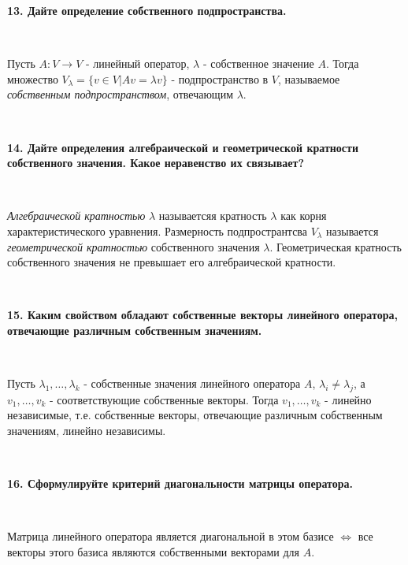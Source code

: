 \documentclass{article}
\begin{document}
    \textbf{13. Дайте определение собственного подпространства.}

    $\;$
        {
        \setlength{\parindent}{0.4cm}
        \hangindent=0.4cm

        Пусть $A:V\rightarrow V$ - линейный оператор, $\lambda$ - собственное значение $A$. Тогда множество $V_\lambda = \{v\in V| Av=\lambda v\}$ - подпространство в $V$, называемое \textit{собственным подпространством}, отвечающим $\lambda$.

        $\;$
        \setlength{\parindent}{0cm}
        \hangindent=0cm
    }

    \newpage

    \textbf{14. Дайте определения алгебраической и геометрической кратности собственного значения. Какое неравенство их связывает?}

    $\;$
        {
        \setlength{\parindent}{0.4cm}
        \hangindent=0.4cm

        \textit{Алгебраической кратностью} $\lambda$ называетсяя кратность $\lambda$ как корня характеристического уравнения. Размерность подпространтсва $V_\lambda$ называется \textit{геометрической кратностью}
        собственного значения $\lambda$. Геометрическая кратность собственного значения не превышает его алгебраической кратности.

        $\;$
        \setlength{\parindent}{0cm}
        \hangindent=0cm
    }


    \textbf{15. Каким свойством обладают собственные векторы линейного оператора, отвечающие различным собственным значениям.}

    $\;$
        {
        \setlength{\parindent}{0.4cm}
        \hangindent=0.4cm

        Пусть $\lambda_1,\dots,\lambda_k$ - собственные значения линейного оператора $A$, $\lambda_i \not = \lambda_j$, а $v_1, \dots, v_k$ - соответствующие собственные векторы. Тогда $v_1, \dots, v_k$ - линейно независимые, т.е. собственные векторы, отвечающие различным собственным значениям, линейно независимы.

        $\;$
        \setlength{\parindent}{0cm}
        \hangindent=0cm
    }

    \textbf{16. Сформулируйте критерий диагональности матрицы оператора.}

    $\;$
        {
        \setlength{\parindent}{0.4cm}
        \hangindent=0.4cm

        Матрица линейного оператора является диагональной в этом базисе $\Leftrightarrow$ все векторы этого базиса являются собственными векторами для $A$.

        $\;$
        \setlength{\parindent}{0cm}
        \hangindent=0cm
    }
\end{document}
